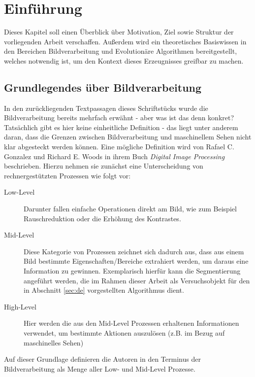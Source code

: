 
\chapter{Einführung}
\label{sec:intro}
	Dieses Kapitel soll einen Überblick über Motivation, Ziel sowie Struktur der vorliegenden Arbeit verschaffen. Außerdem wird ein theoretisches Basiswissen in den Bereichen Bildverarbeitung und Evolutionäre Algorithmen bereitgestellt, welches notwendig ist, um den Kontext dieses Erzeugnisses greifbar zu machen. 
		
	\section{Grundlegendes über Bildverarbeitung}
	\label{sec:bild-basics}
		
		In den zurückliegenden Textpassagen dieses Schriftstücks wurde die Bildverarbeitung bereits mehrfach erwähnt - aber was ist das denn konkret? Tatsächlich gibt es hier keine einheitliche Definition - das liegt unter anderem daran, dass die Grenzen zwischen Bildverarbeitung und maschinellem Sehen nicht klar abgesteckt werden können. Eine mögliche Definition wird von Rafael C. Gonzalez und Richard E. Woods in ihrem Buch \textit{Digital Image Processing} \cite{gonzalez-woods-imgproc} beschrieben. Hierzu nehmen sie zunächst eine Unterscheidung von rechnergestützten Prozessen wie folgt vor: 
		\begin{description}
			\item[Low-Level] Darunter fallen einfache Operationen direkt am Bild, wie zum Beispiel Rauschreduktion oder die Erhöhung des Kontrastes.
			\item[Mid-Level] Diese Kategorie von Prozessen zeichnet sich dadurch aus, dass aus einem Bild bestimmte Eigenschaften/Bereiche extrahiert werden, um daraus eine Information zu gewinnen. Exemplarisch hierfür kann die Segmentierung angeführt werden, die im Rahmen dieser Arbeit als Versuchsobjekt für den in Abschnitt \ref{sec:de} vorgestellten Algorithmus dient.
			\item[High-Level] Hier werden die aus den Mid-Level Prozessen erhaltenen Informationen verwendet, um bestimmte Aktionen auszulösen (z.B. im Bezug auf maschinelles Sehen)
		\end{description}
		
		Auf dieser Grundlage definieren die Autoren in \cite{gonzalez-woods-imgproc} den Terminus der Bildverarbeitung als Menge aller Low- und Mid-Level Prozesse. \\
		
